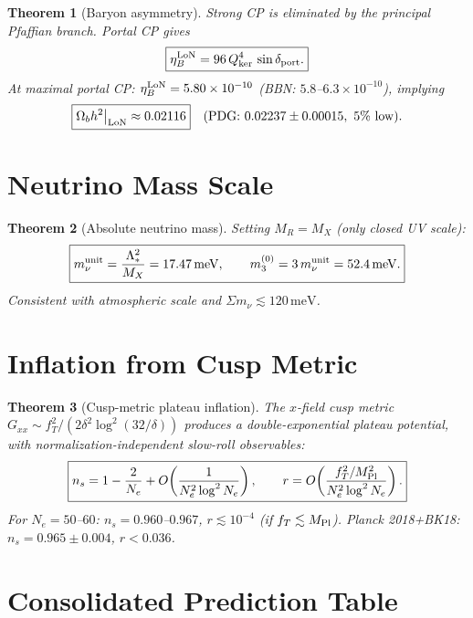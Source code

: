 \documentclass[12pt]{article}
\theoremstyle{plain}
\newtheorem{theorem}{Theorem}[section]
\theoremstyle{definition}
\numberwithin{equation}{section}
\newcommand{\kker}{\mathrm{ker}}
\begin{document}
\begin{theorem}[Baryon asymmetry]\label{thm:baryogen}
Strong CP is eliminated by the principal Pfaffian branch.  Portal CP gives
\[
\boxed{\eta_B^{\rm LoN} = 96\,Q_{\kker}^4\,\sin\delta_{\rm port}.}
\]
At maximal portal CP: $\eta_B^{\rm LoN}=5.80\times10^{-10}$ (BBN: $5.8$--$6.3\times10^{-10}$), implying
\[
\boxed{\Omega_b h^2\big|_{\rm LoN}\approx0.02116}\quad(\text{PDG: }0.02237\pm0.00015,\ 5\%\text{ low}).
\]
\end{theorem}

\section{Neutrino Mass Scale}\label{sec:neutrino}

\begin{theorem}[Absolute neutrino mass]\label{thm:numass}
Setting $M_R=M_X$ (only closed UV scale):
\[
\boxed{m_\nu^{\rm unit}=\frac{\Lambda_*^2}{M_X}=17.47\,\mathrm{meV},\qquad m_3^{(0)}=3\,m_\nu^{\rm unit}=52.4\,\mathrm{meV}.}
\]
Consistent with atmospheric scale and $\Sigma m_\nu\lesssim120\,\mathrm{meV}$.
\end{theorem}

\section{Inflation from Cusp Metric}\label{sec:inflation}

\begin{theorem}[Cusp-metric plateau inflation]\label{thm:inflation}
The $x$-field cusp metric $G_{xx}\sim f_T^2/(2\delta^2\log^2(32/\delta))$ produces a double-exponential plateau potential, with normalization-independent slow-roll observables:
\[
\boxed{n_s=1-\frac{2}{N_e}+O\!\left(\frac{1}{N_e^2\log^2N_e}\right),\qquad
r=O\!\left(\frac{f_T^2/M_{\rm Pl}^2}{N_e^2\log^2N_e}\right).}
\]
For $N_e=50$--$60$: $n_s=0.960$--$0.967$, $r\lesssim10^{-4}$ (if $f_T\lesssim M_{\rm Pl}$).
Planck 2018+BK18: $n_s=0.965\pm0.004$, $r<0.036$.
\end{theorem}

\section{Consolidated Prediction Table}\label{sec:summary2}
\end{document}
